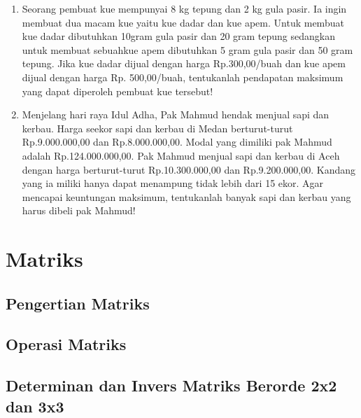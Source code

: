 \documentclass[11pt,fleqn]{book} %
\begin{document}
\begin{exercise}

\begin{enumerate}
\item Seorang pembuat kue mempunyai 8 kg tepung dan 2 kg gula pasir. Ia ingin membuat dua macam kue yaitu kue dadar dan kue apem. Untuk membuat kue dadar dibutuhkan 10gram gula pasir dan 20 gram tepung sedangkan untuk membuat sebuahkue apem dibutuhkan 5 gram gula pasir dan 50 gram tepung. Jika kue dadar dijual dengan harga Rp.300,00/buah dan kue apem dijual dengan harga Rp. 500,00/buah, tentukanlah pendapatan maksimum yang dapat diperoleh pembuat kue tersebut!
\item Menjelang hari raya Idul Adha, Pak Mahmud hendak menjual sapi dan kerbau. Harga seekor sapi dan kerbau di Medan berturut-turut Rp.9.000.000,00 dan Rp.8.000.000,00. Modal yang dimiliki pak Mahmud adalah Rp.124.000.000,00. Pak Mahmud menjual sapi dan kerbau di Aceh dengan harga berturut-turut Rp.10.300.000,00 dan Rp.9.200.000,00. Kandang yang ia miliki hanya dapat menampung tidak lebih dari 15 ekor. Agar mencapai keuntungan maksimum, tentukanlah banyak sapi dan kerbau yang harus dibeli pak Mahmud!
\end{enumerate}
\end{exercise}



\chapter{Matriks}

\section{Pengertian Matriks}

\section{Operasi Matriks}

\section{Determinan dan Invers Matriks Berorde 2x2 dan 3x3 }
\end{document}
